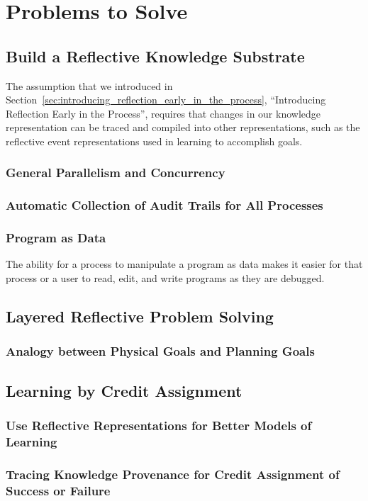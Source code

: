 \chapter{Problems to Solve}\label{ch:problems_to_solve}

\section{Build a Reflective Knowledge Substrate}

The assumption that we introduced in
Section~\ref{sec:introducing_reflection_early_in_the_process},
``Introducing Reflection Early in the Process'', requires that changes
in our knowledge representation can be traced and compiled into other
representations, such as the reflective event representations used in
learning to accomplish goals.

\subsection{General Parallelism and Concurrency}

\subsection{Automatic Collection of Audit Trails for All Processes}

\subsection{Program as Data}

The ability for a process to manipulate a program as data makes it
easier for that process or a user to read, edit, and write programs as
they are debugged.


\section{Layered Reflective Problem Solving}

\subsection{Analogy between Physical Goals and Planning Goals}


\section{Learning by Credit Assignment}

\subsection{Use Reflective Representations for Better Models of Learning}

\subsection{Tracing Knowledge Provenance for Credit Assignment of Success or Failure}



